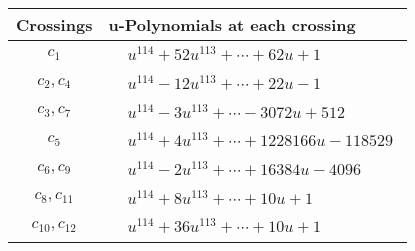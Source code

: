 \documentclass[1p]{elsarticle_modified}
\theoremstyle{definition}
\begin{document}
\begin{tabular}{m{50pt}|m{274pt}}
Crossings & \hspace{64pt}u-Polynomials at each crossing \\
\hline $$\begin{aligned}c_{1}\end{aligned}$$&$\begin{aligned}
&u^{114}+52 u^{113}+\cdots+62 u+1
\end{aligned}$\\
\hline $$\begin{aligned}c_{2},c_{4}\end{aligned}$$&$\begin{aligned}
&u^{114}-12 u^{113}+\cdots+22 u-1
\end{aligned}$\\
\hline $$\begin{aligned}c_{3},c_{7}\end{aligned}$$&$\begin{aligned}
&u^{114}-3 u^{113}+\cdots-3072 u+512
\end{aligned}$\\
\hline $$\begin{aligned}c_{5}\end{aligned}$$&$\begin{aligned}
&u^{114}+4 u^{113}+\cdots+1228166 u-118529
\end{aligned}$\\
\hline $$\begin{aligned}c_{6},c_{9}\end{aligned}$$&$\begin{aligned}
&u^{114}-2 u^{113}+\cdots+16384 u-4096
\end{aligned}$\\
\hline $$\begin{aligned}c_{8},c_{11}\end{aligned}$$&$\begin{aligned}
&u^{114}+8 u^{113}+\cdots+10 u+1
\end{aligned}$\\
\hline $$\begin{aligned}c_{10},c_{12}\end{aligned}$$&$\begin{aligned}
&u^{114}+36 u^{113}+\cdots+10 u+1
\end{aligned}$\\
\hline
\end{tabular}\\~\\
\newpage\renewcommand{\arraystretch}{1}
\end{document}

